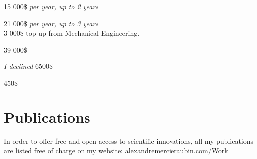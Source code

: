 \documentclass[10pt]{article} %
\begin{document}
{
 15 000\$ \textit{per year, up to 2 years} \\
}

{
 21 000\$ \textit{per year, up to 3 years} \\
 3 000\$ top up from Mechanical Engineering.\\
}

{
\textit{} 39 000\$\\
}

{
\textit{I declined} 6500\$\\
}

{
\textit{} 450\$\\
}

\section{Publications}
In order to offer free and open access to scientific innovations, all my publications are listed free of charge on my website: \href{https://alexandremercieraubin.com/Work}{alexandremercieraubin.com/Work}

\end{document}
